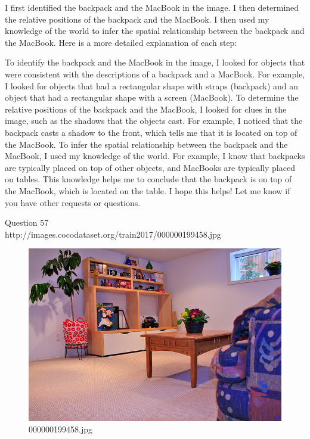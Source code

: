 \begin{enumerate}
    I first identified the backpack and the MacBook in the image.
    I then determined the relative positions of the backpack and the MacBook.
    I then used my knowledge of the world to infer the spatial relationship between the backpack and the MacBook.
    Here is a more detailed explanation of each step:
    
    To identify the backpack and the MacBook in the image, I looked for objects that were consistent with the descriptions of a backpack and a MacBook. For example, I looked for objects that had a rectangular shape with straps (backpack) and an object that had a rectangular shape with a screen (MacBook).
    To determine the relative positions of the backpack and the MacBook, I looked for clues in the image, such as the shadows that the objects cast. For example, I noticed that the backpack casts a shadow to the front, which tells me that it is located on top of the MacBook.
    To infer the spatial relationship between the backpack and the MacBook, I used my knowledge of the world. For example, I know that backpacks are typically placed on top of other objects, and MacBooks are typically placed on tables. This knowledge helps me to conclude that the backpack is on top of the MacBook, which is located on the table.
    I hope this helps! Let me know if you have other requests or questions.
\end{enumerate}
Question 57\\
http://images.cocodataset.org/train2017/000000199458.jpg
\begin{figure}[h]
    \centering
    \includegraphics[width=0.8\linewidth]{../image set/hard/000000199458.jpg}
    \caption{000000199458.jpg}
\end{figure}
